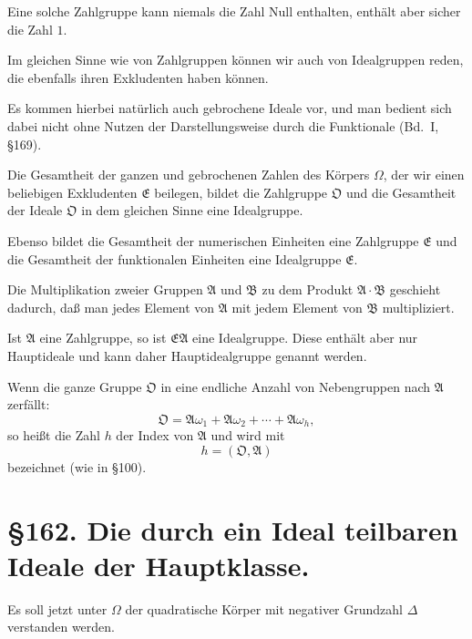 \documentclass[12pt,a4paper]{article}
\begin{document}
Eine solche Zahlgruppe kann niemals die Zahl Null enthalten, enth\"alt aber sicher die Zahl $1$.

Im gleichen Sinne wie von Zahlgruppen k\"onnen wir auch von Idealgruppen reden, die ebenfalls ihren Exkludenten haben k\"onnen.

Es kommen hierbei nat\"urlich auch gebrochene Ideale vor, und man bedient sich dabei nicht ohne Nutzen der Darstellungsweise durch die Funktionale (Bd.~I, \S 169).

Die Gesamtheit der ganzen und gebrochenen Zahlen des K\"orpers $\Omega$, der wir einen beliebigen Exkludenten $\mathfrak{E}$ beilegen, bildet die Zahlgruppe $\mathfrak{O}$ und die Gesamtheit der Ideale $\mathfrak{O}$ in dem gleichen Sinne eine Idealgruppe.

Ebenso bildet die Gesamtheit der numerischen Einheiten eine Zahlgruppe $\mathfrak{E}$ und die Gesamtheit der funktionalen Einheiten eine Idealgruppe $\mathfrak{E}$.

Die Multiplikation zweier Gruppen $\mathfrak{A}$ und $\mathfrak{B}$ zu dem Produkt $\mathfrak{A} \cdot \mathfrak{B}$ geschieht dadurch, da\ss{} man jedes Element von $\mathfrak{A}$ mit jedem Element von $\mathfrak{B}$ multipliziert.

Ist $\mathfrak{A}$ eine Zahlgruppe, so ist $\mathfrak{E}\mathfrak{A}$ eine Idealgruppe. Diese enth\"alt aber nur Hauptideale und kann daher Hauptidealgruppe genannt werden.

Wenn die ganze Gruppe $\mathfrak{O}$ in eine endliche Anzahl von Nebengruppen nach $\mathfrak{A}$ zerf\"allt:
\begin{equation}\mathfrak{O} = \mathfrak{A}\omega_1 + \mathfrak{A}\omega_2 + \cdots + \mathfrak{A}\omega_h,\end{equation}
so hei\ss{}t die Zahl $h$ der Index von $\mathfrak{A}$ und wird mit
\begin{equation}h = (\mathfrak{O}, \mathfrak{A})\end{equation}
bezeichnet (wie in \S 100).

\section*{\S 162. Die durch ein Ideal teilbaren Ideale der Hauptklasse.}

Es soll jetzt unter $\Omega$ der quadratische K\"orper mit negativer Grundzahl $\Delta$ verstanden werden.
\end{document}
